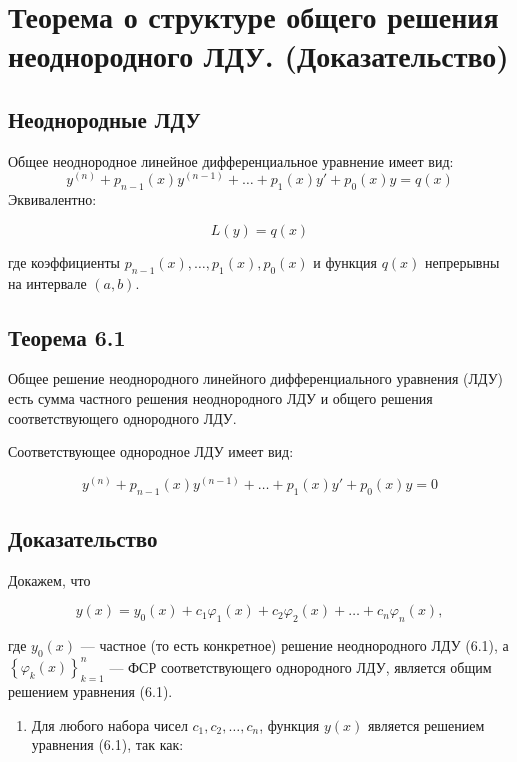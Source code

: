 {
	\section{Теорема о структуре общего решения неоднородного ЛДУ. (Доказательство)}


	\subsection*{Неоднородные ЛДУ}

	Общее неоднородное линейное дифференциальное уравнение имеет вид:
	\begin{equation}
	y^{(n)} + p_{n-1}(x)y^{(n-1)} + \ldots + p_1(x)y' + p_0(x)y = q(x) \tag{6.1}
	\end{equation}
	Эквивалентно:


	\[
	L(y) = q(x)
	\]


	где коэффициенты \( p_{n-1}(x), \ldots, p_1(x), p_0(x) \) и функция \( q(x) \) непрерывны на интервале \( (a, b) \).



	\subsection*{Теорема 6.1}

	Общее решение неоднородного линейного дифференциального уравнения (ЛДУ) есть сумма частного решения неоднородного ЛДУ и общего решения соответствующего однородного ЛДУ.

	Соответствующее однородное ЛДУ имеет вид:


	\[
	y^{(n)} + p_{n-1}(x)y^{(n-1)} + \ldots + p_1(x)y' + p_0(x)y = 0
	\]

	\subsection*{Доказательство}

	Докажем, что


	\[
	y(x) = y_0(x) + c_1 \varphi_1(x) + c_2 \varphi_2(x) + \ldots + c_n \varphi_n(x),
	\]


	где \( y_0(x) \) — частное (то есть конкретное) решение неоднородного ЛДУ (6.1), а \( \left\{ \varphi_k(x) \right\}_{k=1}^{n} \) — ФСР соответствующего однородного ЛДУ, является общим решением уравнения (6.1).

	\begin{enumerate}
		\item Для любого набора чисел \( c_1, c_2, \ldots, c_n \), функция \( y(x) \) является решением уравнения (6.1), так как:
  


\end{enumerate}}
